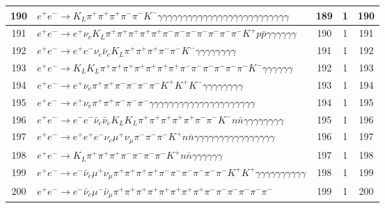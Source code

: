 \documentclass[landscape]{article}
\begin{document}
\begin{table}[htbp!]
\begin{tabular}{|c|>{\centering}p{18cm}|c|c|c|}
\hline
190 & $ e^{+} e^{-} \rightarrow K_{L} \pi^{+} \pi^{+} \pi^{+} \pi^{-} \pi^{-} K^{-} \gamma \gamma \gamma \gamma \gamma \gamma \gamma \gamma \gamma \gamma \gamma \gamma \gamma \gamma \gamma \gamma \gamma \gamma \gamma \gamma \gamma \gamma \gamma \gamma \gamma \gamma $ & 189 & 1 & 190 \\
\hline
191 & $ e^{+} e^{-} \rightarrow e^{+} \nu_{e} K_{L} \pi^{+} \pi^{+} \pi^{+} \pi^{+} \pi^{+} \pi^{-} \pi^{-} \pi^{-} \pi^{-} \pi^{-} \pi^{-} \pi^{-} K^{+} p \bar{p} \gamma \gamma \gamma \gamma \gamma \gamma $ & 190 & 1 & 191 \\
\hline
192 & $ e^{+} e^{-} \rightarrow e^{+} e^{-} \nu_{e} \bar{\nu}_{e} K_{L} \pi^{+} \pi^{+} \pi^{+} \pi^{-} \pi^{-} K^{-} \gamma \gamma \gamma \gamma \gamma \gamma \gamma \gamma $ & 191 & 1 & 192 \\
\hline
193 & $ e^{+} e^{-} \rightarrow K_{L} K_{L} \pi^{+} \pi^{+} \pi^{+} \pi^{+} \pi^{+} \pi^{+} \pi^{+} \pi^{-} \pi^{-} \pi^{-} \pi^{-} \pi^{-} \pi^{-} K^{-} \gamma \gamma \gamma \gamma \gamma \gamma $ & 192 & 1 & 193 \\
\hline
194 & $ e^{+} e^{-} \rightarrow e^{+} \nu_{e} \pi^{+} \pi^{+} \pi^{-} \pi^{-} \pi^{-} \pi^{-} K^{+} K^{+} K^{-} \gamma \gamma \gamma \gamma \gamma \gamma \gamma \gamma $ & 193 & 1 & 194 \\
\hline
195 & $ e^{+} e^{-} \rightarrow e^{+} \nu_{e} \pi^{+} \pi^{+} \pi^{-} \pi^{-} \pi^{-} \gamma \gamma \gamma \gamma \gamma \gamma \gamma \gamma \gamma \gamma \gamma \gamma \gamma \gamma \gamma \gamma \gamma \gamma \gamma \gamma \gamma $ & 194 & 1 & 195 \\
\hline
196 & $ e^{+} e^{-} \rightarrow e^{-} e^{-} \bar{\nu}_{e} \bar{\nu}_{e} K_{L} K_{L} \pi^{+} \pi^{+} \pi^{+} \pi^{+} \pi^{+} \pi^{-} \pi^{-} K^{-} n \bar{n} \gamma \gamma \gamma \gamma \gamma \gamma \gamma \gamma $ & 195 & 1 & 196 \\
\hline
197 & $ e^{+} e^{-} \rightarrow e^{+} e^{+} e^{-} \nu_{e} \mu^{+} \nu_{\mu} \pi^{-} \pi^{-} \pi^{-} K^{+} n \bar{n} \gamma \gamma \gamma \gamma \gamma \gamma \gamma \gamma \gamma \gamma \gamma \gamma \gamma \gamma \gamma \gamma $ & 196 & 1 & 197 \\
\hline
198 & $ e^{+} e^{-} \rightarrow K_{L} \pi^{+} \pi^{+} \pi^{+} \pi^{-} \pi^{-} \pi^{-} \pi^{-} K^{+} n \bar{n} \gamma \gamma \gamma \gamma \gamma \gamma $ & 197 & 1 & 198 \\
\hline
199 & $ e^{+} e^{-} \rightarrow e^{-} \bar{\nu}_{e} \mu^{+} \nu_{\mu} \pi^{+} \pi^{+} \pi^{+} \pi^{+} \pi^{-} \pi^{-} \pi^{-} \pi^{-} \pi^{-} \pi^{-} K^{+} K^{+} \gamma \gamma \gamma \gamma \gamma \gamma \gamma \gamma \gamma \gamma $ & 198 & 1 & 199 \\
\hline
200 & $ e^{+} e^{-} \rightarrow e^{-} \bar{\nu}_{e} \mu^{-} \bar{\nu}_{\mu} \pi^{+} \pi^{+} \pi^{+} \pi^{+} \pi^{+} \pi^{+} \pi^{+} \pi^{+} \pi^{-} \pi^{-} \pi^{-} \pi^{-} \pi^{-} \pi^{-} $ & 199 & 1 & 200 \\
\hline
\end{tabular}
\end{table}
\end{document}
